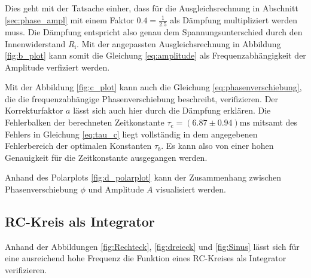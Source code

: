 \noindent
Dies geht mit der Tatsache einher, dass für die Ausgleichsrechnung in Abschnitt \ref{sec:phase_ampl} mit einem Faktor 
$\num{0.4} = \frac{1}{\num{2.5}}$ als Dämpfung multipliziert werden muss.
Die Dämpfung entspricht also genau dem Spannungsunterschied durch den Innenwiderstand $R_\text{i}$.
Mit der angepassten Ausgleichsrechnung in Abbildung \ref{fig:b_plot} kann somit die Gleichung \eqref{eq:amplitude} 
als Frequenzabhängigkeit der Amplitude verfiziert werden.

\noindent
Mit der Abbildung \ref{fig:c_plot} kann auch die Gleichung \eqref{eq:phasenverschiebung}, die die frequenzabhängige Phasenverschiebung 
beschreibt, verifizieren.
Der Korrekturfaktor $a$ lässt sich auch hier durch die Dämpfung erklären.
Die Fehlerbalken der berechneten Zeitkonstante $\tau_\text{c} = (\num{6.87} \pm \num{0.94}) \unit{\milli\s}$ mitsamt des Fehlers
in Gleichung \eqref{eq:tau_c} liegt vollständig in dem angegebenen Fehlerbereich der optimalen Konstanten $\tau_b$.
Es kann also von einer hohen Genauigkeit für die Zeitkonstante ausgegangen werden.

\noindent
Anhand des Polarplots \ref{fig:d_polarplot} kann der Zusammenhang zwischen Phasenverschiebung $\phi$ und Amplitude $A$ visualisiert werden.




\subsection{RC-Kreis als Integrator}
Anhand der Abbildungen \ref{fig:Rechteck}, \ref{fig:dreieck} und \ref{fig:Sinus} lässt sich für eine ausreichend hohe Frequenz die Funktion eines RC-Kreises als Integrator verifizieren.

